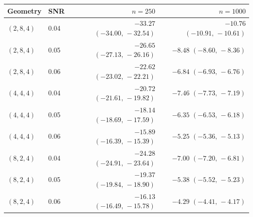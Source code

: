 \begin{tabular}{llrr}
\toprule
Geometry & SNR & $n=250$ & $n=1000$ \\
\midrule
$(2,8,4)$ & 0.04 & $-33.27$ $(-34.00,\,-32.54)$ & $-10.76$ $(-10.91,\,-10.61)$ \\
$(2,8,4)$ & 0.05 & $-26.65$ $(-27.13,\,-26.16)$ & $-8.48$ $(-8.60,\,-8.36)$ \\
$(2,8,4)$ & 0.06 & $-22.62$ $(-23.02,\,-22.21)$ & $-6.84$ $(-6.93,\,-6.76)$ \\
\addlinespace
$(4,4,4)$ & 0.04 & $-20.72$ $(-21.61,\,-19.82)$ & $-7.46$ $(-7.73,\,-7.19)$ \\
$(4,4,4)$ & 0.05 & $-18.14$ $(-18.69,\,-17.59)$ & $-6.35$ $(-6.53,\,-6.18)$ \\
$(4,4,4)$ & 0.06 & $-15.89$ $(-16.39,\,-15.39)$ & $-5.25$ $(-5.36,\,-5.13)$ \\
\addlinespace
$(8,2,4)$ & 0.04 & $-24.28$ $(-24.91,\,-23.64)$ & $-7.00$ $(-7.20,\,-6.81)$ \\
$(8,2,4)$ & 0.05 & $-19.37$ $(-19.84,\,-18.90)$ & $-5.38$ $(-5.52,\,-5.23)$ \\
$(8,2,4)$ & 0.06 & $-16.13$ $(-16.49,\,-15.78)$ & $-4.29$ $(-4.41,\,-4.17)$ \\
\bottomrule
\end{tabular}
